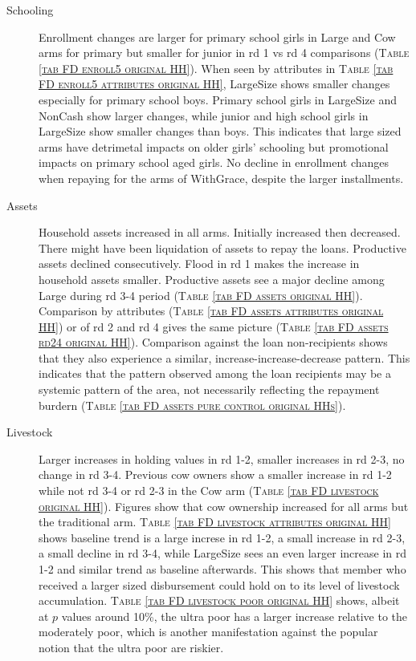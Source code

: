 \begin{description}
\item[Schooling]	Enrollment changes are larger for primary school girls in \textsf{Large} and \textsf{Cow} arms for primary but smaller for junior in rd 1 vs rd 4 comparisons (\textsc{Table \ref{tab FD enroll5 original HH}}). When seen by attributes in \textsc{\normalsize Table \ref{tab FD enroll5 attributes original HH}}, \textsf{LargeSize} shows smaller changes especially for primary school boys. Primary school girls in \textsf{LargeSize} and \textsf{NonCash} show larger changes, while junior and high school girls in \textsf{LargeSize} show smaller changes than boys. This indicates that large sized arms have detrimetal impacts on older girls' schooling but promotional impacts on primary school aged girls. No decline in enrollment changes when repaying for the arms of \textsf{WithGrace}, despite the larger installments.
\item[Assets]	Household assets increased in all arms. Initially increased then decreased. There might have been liquidation of assets to repay the loans. Productive assets declined consecutively. Flood in rd 1 makes the increase in household assets smaller. Productive assets see a major decline among \textsf{Large} during rd 3-4 period (\textsc{\normalsize Table \ref{tab FD assets original HH}}). Comparison by attributes (\textsc{\normalsize Table \ref{tab FD assets attributes original HH}}) or of rd 2 and rd 4 gives the same picture (\textsc{\normalsize Table \ref{tab FD assets rd24 original HH}}). Comparison against the loan non-recipients shows that they also experience a similar, increase-increase-decrease pattern. This indicates that the pattern observed among the loan recipients may be a systemic pattern of the area, not necessarily reflecting the repayment burdern (\textsc{\normalsize Table \ref{tab FD assets pure control original HHs}}).
\item[Livestock]	Larger increases in holding values in rd 1-2, smaller increases in rd 2-3, no change in rd 3-4. Previous cow owners show a smaller increase in rd 1-2 while not rd 3-4 or rd 2-3 in the \textsf{Cow} arm (\textsc{\normalsize Table \ref{tab FD livestock original HH}}). Figures show that cow ownership increased for all arms but the \textsf{traditional} arm. \textsc{\normalsize Table \ref{tab FD livestock attributes original HH}} shows baseline trend is a large increse in rd 1-2, a small increase in rd 2-3, a small decline in rd 3-4, while \textsf{LargeSize} sees an even larger increase in rd 1-2 and similar trend as baseline afterwards. This shows that member who received a larger sized disbursement could hold on to its level of livestock accumulation. \textsc{\normalsize Table \ref{tab FD livestock poor original HH}} shows, albeit at $p$ values around 10\%, the ultra poor has a larger increase relative to the moderately poor, which is another manifestation against the popular notion that the ultra poor are riskier.

\end{description}
